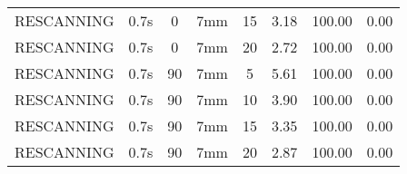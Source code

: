 \begin{table}[H]
\begin{tabular}{|c||c|c|c|c||c|c|c|}
RESCANNING & 0.7s & 0 & 7mm & 15 & 3.18 & 100.00 & 0.00 \\
RESCANNING & 0.7s & 0 & 7mm & 20 & 2.72 & 100.00 & 0.00 \\
RESCANNING & 0.7s & 90 & 7mm & 5 & 5.61 & 100.00 & 0.00 \\
RESCANNING & 0.7s & 90 & 7mm & 10 & 3.90 & 100.00 & 0.00 \\
RESCANNING & 0.7s & 90 & 7mm & 15 & 3.35 & 100.00 & 0.00 \\
RESCANNING & 0.7s & 90 & 7mm & 20 & 2.87 & 100.00 & 0.00 \\
    \hline\hline 
  \end{tabular}
  \label{tab:Pat02_LPV}
\end{table}

\newpage
\thispagestyle{realempty}
\vspace*{-2cm}

